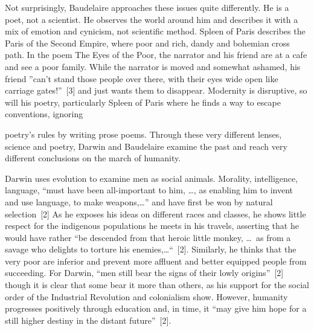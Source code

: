 \begin{multicols}{2}
Not surprisingly, Baudelaire approaches these issues quite differently. He is a poet, not a scientist. He observes the world around him and describes it with a mix
of emotion and cynicism, not scientific method. Spleen of Paris describes the Paris of the Second Empire, where poor and rich, dandy and bohemian cross path. In the
poem The Eyes of the Poor, the narrator and his friend are at a cafe and see a poor family. While the narrator is moved and somewhat ashamed, his friend
”can’t stand those people over there, with their eyes wide open like carriage gates!”~[3] and just wants them to disappear. Modernity is disruptive, so will his 
poetry, particularly Spleen of Paris where he finds a way to escape conventions, ignoring
\begin{figure}
\label{img:darwin.jpg}\vspace*{-1.3cm}
\end{figure}
poetry's rules by writing prose poems. Through these very different lenses,
science and poetry, Darwin and Baudelaire examine the past and reach very different conclusions on the march of humanity.

Darwin uses evolution to examine men as social animals.  Morality, intelligence, language, ``must have been 
all-important to him, \dots, as enabling him to invent
and use language, to make weapons,\dots” and have first be won by natural selection~[2]  As he exposes his ideas on different races and classes, he shows little 
respect for the indigenous populations he meets in his travels, asserting that he would have rather “be descended from that heroic little monkey, \dots\ as from a
savage who delights to torture his enemies,\dots“~[2]. Similarly, he thinks that the very poor are inferior and prevent more affluent and better equipped people from
succeeding. For Darwin, “men still bear the signs of their lowly origins”~[2] though it is clear that some bear it more than others, as his support for the social
order of the Industrial Revolution and colonialism show.   However, humanity progresses positively through education and, in time, it ``may give him hope for a still
higher destiny in the distant future''~[2].


\end{multicols}
